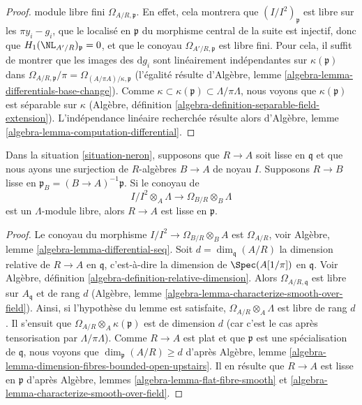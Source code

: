 \begin{proof}
module libre fini $\Omega_{A/R, \mathfrak p}$.
En effet, cela montrera que $(I/I^2)_\mathfrak p$ est libre sur les
$\pi y_i - g_i$, que le localisé en $\mathfrak p$ du morphisme central
de la suite est injectif, donc que $H_1(\NL_{A'/R})_\mathfrak p = 0$, et que
le conoyau $\Omega_{A'/R, \mathfrak p}$ est libre fini.
Pour cela, il suffit de montrer que les images des $\text{d}g_i$ sont
linéairement indépendantes sur $\kappa(\mathfrak p)$ dans
$\Omega_{A/R, \mathfrak p}/\pi = \Omega_{(A/\pi A)/\kappa, \mathfrak p}$
(l'égalité résulte d'Algèbre, lemme \ref{algebra-lemma-differentials-base-change}).
Comme $\kappa \subset \kappa(\mathfrak p) \subset \Lambda/\pi \Lambda$,
nous voyons que $\kappa(\mathfrak p)$ est séparable sur $\kappa$
(Algèbre, définition \ref{algebra-definition-separable-field-extension}).
L'indépendance linéaire recherchée résulte alors d'Algèbre,
lemme \ref{algebra-lemma-computation-differential}.
\end{proof}

\begin{lemma}
\label{lemma-neron-when-smooth}
Dans la situation \ref{situation-neron}, supposons que $R \to A$ soit lisse
en $\mathfrak q$ et que nous ayons une surjection de $R$-algèbres
$B \to A$ de noyau $I$. Supposons $R \to B$ lisse en
$\mathfrak p_B = (B \to A)^{-1}\mathfrak p$. Si le conoyau de
$$
I/I^2 \otimes_A \Lambda \to \Omega_{B/R} \otimes_B \Lambda
$$
est un $\Lambda$-module libre, alors $R \to A$ est lisse en $\mathfrak p$.
\end{lemma}

\begin{proof}
Le conoyau du morphisme $I/I^2 \to \Omega_{B/R} \otimes_B A$
est $\Omega_{A/R}$, voir Algèbre, lemme \ref{algebra-lemma-differential-seq}.
Soit $d = \dim_\mathfrak q(A/R)$ la dimension relative de $R \to A$
en $\mathfrak q$, c'est-à-dire la dimension de $\Spec(A[1/\pi])$ en $\mathfrak q$.
Voir Algèbre, définition \ref{algebra-definition-relative-dimension}.
Alors $\Omega_{A/R, \mathfrak q}$ est libre sur $A_\mathfrak q$ et de rang $d$
(Algèbre, lemme \ref{algebra-lemma-characterize-smooth-over-field}).
Ainsi, si l'hypothèse du lemme est satisfaite,
$\Omega_{A/R} \otimes_A \Lambda$ est libre de rang $d$.
Il s'ensuit que $\Omega_{A/R} \otimes_A \kappa(\mathfrak p)$
est de dimension $d$ (car c'est le cas après tensorisation par $\Lambda/\pi \Lambda$).
Comme $R \to A$ est plat et que $\mathfrak p$
est une spécialisation de $\mathfrak q$, nous voyons que
$\dim_\mathfrak p(A/R) \geq d$ d'après Algèbre, lemme
\ref{algebra-lemma-dimension-fibres-bounded-open-upstairs}.
Il en résulte que $R \to A$ est lisse en $\mathfrak p$ d'après
Algèbre, lemmes \ref{algebra-lemma-flat-fibre-smooth} et
\ref{algebra-lemma-characterize-smooth-over-field}.
\end{proof}

